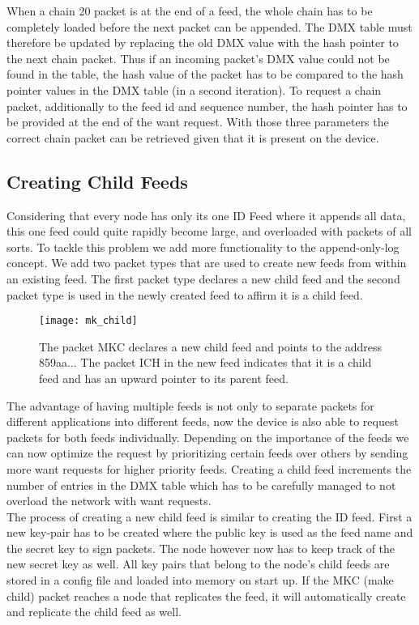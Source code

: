When a chain 20 packet is at the end of a feed, the whole chain has to be completely loaded before the next packet can be appended. The DMX table must therefore be updated by replacing the old DMX value with the hash pointer to the next chain packet. Thus if an incoming packet's DMX value could not be found in the table, the hash value of the packet has to be compared to the hash pointer values in the DMX table (in a second iteration). To request a chain packet, additionally to the feed id and sequence number, the hash pointer has to be provided at the end of the want request. With those three parameters the correct chain packet can be retrieved given that it is present on the device. \\


\subsection{Creating Child Feeds}
Considering that every node has only its one ID Feed where it appends all data, this one feed could quite rapidly become large, and overloaded with packets of all sorts. To tackle this problem we add more functionality to the append-only-log concept. We add two packet types that are used to create new feeds from within an existing feed. The first packet type declares a new child feed and the second packet type is used in the newly created feed to affirm it is a child feed.

\begin{figure}
\centering
\texttt{[image: mk\_child]}
\caption{The packet MKC declares a new child feed and points to the address 859aa... The packet ICH in the new feed indicates that it is a child feed and has an upward pointer to its parent feed.}
\label{fig:mk_child}
\end{figure}

The advantage of having multiple feeds is not only to separate packets for different applications into different feeds, now the device is also able to request packets for both feeds individually. Depending on the importance of the feeds we can now optimize the request by prioritizing certain feeds over others by sending more want requests for higher priority feeds. Creating a child feed increments the number of entries in the DMX table which has to be carefully managed to not overload the network with want requests. \\
The process of creating a new child feed is similar to creating the ID feed. First a new key-pair has to be created where the public key is used as the feed name and the secret key to sign packets. The node however now has to keep track of the new secret key as well. All key pairs that belong to the node's child feeds are stored in a config file and loaded into memory on start up. If the MKC (make child) packet reaches a node that replicates the feed, it will automatically create and replicate the child feed as well.

